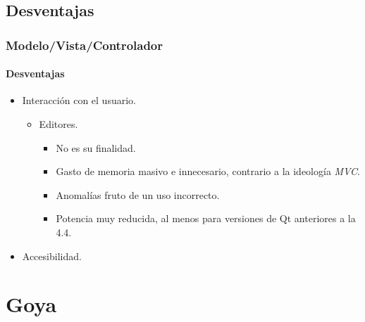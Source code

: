\documentclass[12pt]{beamer}
\begin{document}
\subsection{Desventajas}
\begin{frame}
  \frametitle{Modelo/Vista/Controlador}
  \framesubtitle{Desventajas}

  \begin{block}{}
    \begin{itemize}
      \item Interacción con el usuario.
        \begin{itemize}
            \item Editores.
            \begin{itemize}
              \item \alert{No} es su finalidad.
              \medskip
              \pause
              \item Gasto de memoria masivo e innecesario, contrario a la ideología \emph{MVC}.
              \medskip
              \pause
              \item Anomalías fruto de un uso incorrecto.
              \medskip
              \pause
              \item Potencia muy reducida, al menos para versiones de Qt anteriores a la 4.4.
            \end{itemize}
        \end{itemize}
      \medskip
      \pause
      \item Accesibilidad.
    \end{itemize}
  \end{block}

\end{frame}

\section{Goya}
\end{document}
